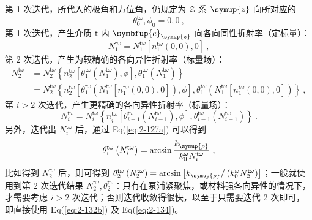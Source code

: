 第 1 次迭代，所代入的极角和方位角，仍规定为 $\mathcal{Z}$ 系 $\symup{z}$ 向所对应的
\begin{equation} \label{eq:2-130}
	\theta^{\mathsf{t}\omega}_{0}, \phi_{0} = 0, 0 ~,
\end{equation}
第 1 次迭代，产生介质 $\mathsf{t}$ 内 $\symbfup{e}_{\symup{z}}$ 向各向同性折射率（定标量）：
\begin{equation} \label{eq:2-131}
	N^{\mathsf{t}\omega}_{1} = N^{\mathsf{t}\omega}_{1} \left[ n^{\mathsf{t}\omega}_{1} \left( 0, 0 \right), 0 \right] ~,
\end{equation}
第 2 次迭代，产生为较精确的各向异性折射率（标量场）：
\begin{subequations} \label{eq:2-132}
\begin{align}
	N^{\mathsf{t}\omega}_{2} &= N^{\mathsf{t}\omega}_{2} \left\{ n^{\mathsf{t}\omega}_{2} \left[ \theta^{\mathsf{t}\omega}_{1} \left( N^{\mathsf{t}\omega}_{1} \right), \phi \right], \theta^{\mathsf{t}\omega}_{1} \left( N^{\mathsf{t}\omega}_{1} \right) \right\} \label{eq:2-132a} \\ &= N^{\mathsf{t}\omega}_{2} \left\{ n^{\mathsf{t}\omega}_{2} \left[ \theta^{\mathsf{t}\omega}_{1} \left( N^{\mathsf{t}\omega}_{1} \left[ n^{\mathsf{t}\omega}_{1} \left( 0, 0 \right), 0 \right] \right), \phi \right], \theta^{\mathsf{t}\omega}_{1} \left( N^{\mathsf{t}\omega}_{1} \left[ n^{\mathsf{t}\omega}_{1} \left( 0, 0 \right), 0 \right] \right) \right\} \label{eq:2-132b}~,
\end{align}
\end{subequations}
第 $i > 2$ 次迭代，产生更精确的各向异性折射率（标量场）：
\begin{equation} \label{eq:2-133}
	N^{\mathsf{t}\omega}_{i} = N^{\mathsf{t}\omega}_{i} \left\{ n^{\mathsf{t}\omega}_{i} \left[ \theta^{\mathsf{t}\omega}_{i-1} \left( N^{\mathsf{t}\omega}_{i-1} \right), \phi \right], \theta^{\mathsf{t}\omega}_{i-1} \left( N^{\mathsf{t}\omega}_{i-1} \right) \right\} ~.
\end{equation}
另外，迭代出 $N^{\mathsf{t}\omega}_{i}$ 后，通过 Eq(\ref{eq:2-127a}) 可以得到
\begin{equation} \label{eq:2-134}
	\theta^{\mathsf{t}\omega}_{i} \left( N^{\mathsf{t}\omega}_{i} \right) = \arcsin \frac{ k_{\symup{\rho}} }{ k^{\omega}_{0} N^{\mathsf{t}\omega}_{i} } ~,
\end{equation}
比如得到 $N^{\mathsf{t}\omega}_{2}$ 后，则可得到 $\theta^{\mathsf{t}\omega}_{2} \left( N^{\mathsf{t}\omega}_{2} \right) = \arcsin \left[ k_{\symup{\rho}} \big/ \left( k^{\omega}_{0} N^{\mathsf{t}\omega}_{2} \right) \right]$；一般就使用到第 2 次迭代结果 $N^{\mathsf{t}\omega}_{2}, \theta^{\mathsf{t}\omega}_{2}$：只有在泵浦紧聚焦，或材料强各向异性的情况下，才需要考虑 $i > 2$ 次迭代；否则迭代收敛得很快，以至于只需要迭代 2 次即可，即直接使用 Eq(\ref{eq:2-132b}) 及 Eq(\ref{eq:2-134})。

